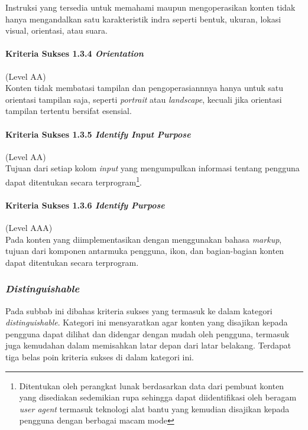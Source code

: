 Instruksi yang tersedia untuk memahami maupun mengoperasikan konten tidak hanya mengandalkan satu karakteristik indra seperti bentuk, ukuran, lokasi visual, orientasi, atau suara.

\paragraph{Kriteria Sukses 1.3.4 \textit{Orientation}}
\label{sec:kriteria_sukses_1.3.4}
(Level AA)\\

Konten tidak membatasi tampilan dan pengoperasiannnya hanya untuk satu orientasi tampilan saja, seperti \textit{portrait} atau \textit{landscape}, kecuali jika orientasi tampilan tertentu bersifat esensial.

\paragraph{Kriteria Sukses 1.3.5 \textit{Identify Input Purpose}}
\label{sec:kriteria_sukses_1.3.5}
(Level AA)\\

Tujuan dari setiap kolom \textit{input} yang mengumpulkan informasi tentang pengguna dapat ditentukan secara terprogram\footnote{Ditentukan oleh perangkat lunak berdasarkan data dari pembuat konten yang disediakan sedemikian rupa sehingga dapat diidentifikasi oleh beragam \textit{user agent} termasuk teknologi alat bantu yang kemudian disajikan kepada pengguna dengan berbagai macam mode}.

\paragraph{Kriteria Sukses 1.3.6 \textit{Identify Purpose}}
\label{sec:kriteria_sukses_1.3.6}
(Level AAA)\\

Pada konten yang diimplementasikan dengan menggunakan bahasa \textit{markup}, tujuan dari komponen antarmuka pengguna, ikon, dan bagian-bagian konten dapat ditentukan secara terprogram.

\subsubsection{\textit{Distinguishable}}
\label{sec:distinguishable}
Pada subbab ini dibahas kriteria sukses yang termasuk ke dalam kategori \textit{distinguishable}. Kategori ini mensyaratkan agar konten yang disajikan kepada pengguna dapat dilihat dan didengar dengan mudah oleh pengguna, termasuk juga kemudahan dalam memisahkan latar depan dari latar belakang. Terdapat tiga belas poin kriteria sukses di dalam kategori ini.

